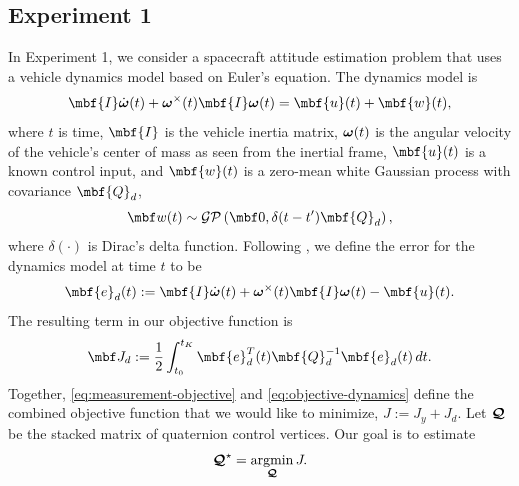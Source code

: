 \documentclass[11pt,a4paper,oneside]{article}
\begin{document}
\subsection{Experiment 1}
In Experiment 1, we consider a spacecraft attitude estimation problem that uses a vehicle dynamics model based on Euler's equation.
The dynamics model is
\begin{equation}
  \label{eq:dynamics}
  \mbf{I} \mbsdot{\omega}(t) + \mbs{\omega}^{\times}(t) \mbf{I} \mbs{\omega}(t) = \mbf{u}(t) + \mbf{w}(t),
\end{equation}
where $t$ is time, $\mbf{I}$ is the vehicle inertia matrix, ${\boldsymbol{\omega}}(t)$ is the angular velocity of the vehicle's center of mass as seen from the inertial frame, $\mbf{u}(t)$ is a known control input, and $\mbf{w}(t)$ is a zero-mean white Gaussian process with covariance $\mbf{Q}_{d}$,
\begin{equation}
  \label{eq:process-noise}
 \mbf w(t) \sim \mathcal{GP}\left(\mbf 0,  \delta(t - t^{\prime}) \mbf{Q}_{d} \right),
\end{equation}
where $\delta(\cdot)$ is Dirac's delta function. 
Following \citet{Furgale1200}, we define the error for the dynamics model at time $t$ to be
\begin{equation}
  \label{eq:error-dynamics}
  \mbf{e}_{d}(t) := \mbf{I} \mbsdot{\omega}(t) + \mbs{\omega}^{\times}(t) \mbf{I} \mbs{\omega}(t) - \mbf{u}(t).
\end{equation}
The resulting term in our objective function is
\begin{equation}
  \label{eq:objective-dynamics}
  \mbf J_{d} := \frac{1}{2} \int_{t_0}^{t_K} \mbf{e}_{d}^T(t) \mbf{Q}^{-1}_{d} \mbf{e}_{d}(t)\,dt.
\end{equation}
Together, \eqref{eq:measurement-objective} and \eqref{eq:objective-dynamics} define the combined objective function that we would like to minimize, $J := J_{y} + J_{d}$. Let ${{\boldsymbol{\mathcal{Q}}}}$ be the stacked matrix of quaternion control vertices. Our goal is to estimate
\begin{equation}
  \label{eq:e1-argmin}
  \mbc{Q}^{\star} = \argmin_{\mbc{Q}} J.
\end{equation}
\end{document}
